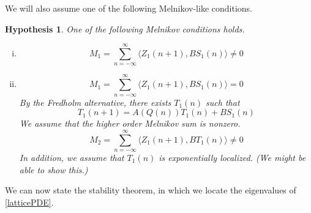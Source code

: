 \documentclass[12pt]{article}
\newtheorem{hypothesis}{Hypothesis}
\begin{document}
We will also assume one of the following Melnikov-like conditions.
\begin{hypothesis}\label{melnikovhyp}
One of the following Melnikov conditions holds.
\begin{enumerate}[(i)]
\item
\[
M_1 = \sum_{n=-\infty}^\infty \langle Z_1(n+1), B S_1(n) \rangle \neq 0
\]
\item 
\[
M_1 = \sum_{n=-\infty}^\infty \langle Z_1(n+1), B S_1(n) \rangle = 0
\]
By the Fredholm alternative, there exists $T_1(n)$ such that 
\[
T_1(n+1) = A(Q(n)) T_1(n) + B S_1(n)
\]
We assume that the higher order Melnikov sum is nonzero.
\[
M_2 = \sum_{n=-\infty}^\infty \langle Z_1(n+1), B T_1(n) \rangle \neq 0 
\]
In addition, we assume that $T_1(n)$ is exponentially localized. (We might be able to show this.)
\end{enumerate}
\end{hypothesis}

We can now state the stability theorem, in which we locate the eigenvalues of \eqref{latticePDE}.
\end{document}
